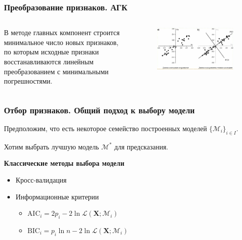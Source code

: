 \documentclass[ucs, notheorems, handout]{beamer}
\newcommand{\X}{\bm{X}}
\begin{document}
		\begin{frame}
		\frametitle{Преобразование признаков. АГК}	
		\begin{columns}
			\begin{column}{0.47\textwidth}
				
					В методе главных компонент строится минимальное число новых признаков, по которым исходные признаки восстанавливаются линейным преобразованием с минимальными погрешностями.
				
				
				
			\end{column}
			\begin{column}{0.5\textwidth}
				\begin{figure}[]
					\includegraphics[width=1.1\textwidth]{../img/3}
				\end{figure}
			\end{column}
		\end{columns}
		\note{
			
		}
	\end{frame}
	
	\begin{frame}
		
	    \frametitle{Отбор признаков. Общий подход к выбору модели}
	
	Предположим, что есть некоторое семейство построенных моделей $\{\mathcal M_i\}_{i \in I}$.
	
	Хотим выбрать лучшую модель $\mathcal M^*$ для предсказания.
	
	\begin{center}
		\textbf{Классические методы выбора модели}
	\end{center} 
	
	\begin{itemize}
		\item Кросс-валидация
		\item Информационные критерии
		\begin{itemize}
		\item $\mathrm{AIC}_i = 2p_i - 2\ln{\mathcal L(\X; \mathcal M_i)}$
		\item $\mathrm{BIC}_i = p_i\ln{n} - 2\ln{\mathcal L(\X; \mathcal M_i)}$
		\end{itemize}
	
	\end{itemize}
	
	\end{frame}
	
	
	
\end{document}

